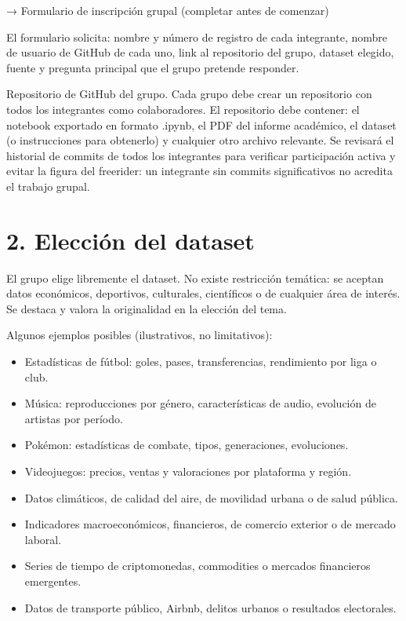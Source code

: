 \documentclass[10pt]{article}
\begin{document}
→ Formulario de inscripción grupal (completar antes de comenzar)

El formulario solicita: nombre y número de registro de cada integrante, nombre de usuario de GitHub de cada uno, link al repositorio del grupo, dataset elegido, fuente y pregunta principal que el grupo pretende responder.

Repositorio de GitHub del grupo. Cada grupo debe crear un repositorio con todos los integrantes como colaboradores. El repositorio debe contener: el notebook exportado en formato .ipynb, el PDF del informe académico, el dataset (o instrucciones para obtenerlo) y cualquier otro archivo relevante. Se revisará el historial de commits de todos los integrantes para verificar participación activa y evitar la figura del freerider: un integrante sin commits significativos no acredita el trabajo grupal.

\section*{2. Elección del dataset}
El grupo elige libremente el dataset. No existe restricción temática: se aceptan datos económicos, deportivos, culturales, científicos o de cualquier área de interés. Se destaca y valora la originalidad en la elección del tema.

Algunos ejemplos posibles (ilustrativos, no limitativos):

\begin{itemize}
  \item Estadísticas de fútbol: goles, pases, transferencias, rendimiento por liga o club.
  \item Música: reproducciones por género, características de audio, evolución de artistas por período.
  \item Pokémon: estadísticas de combate, tipos, generaciones, evoluciones.
  \item Videojuegos: precios, ventas y valoraciones por plataforma y región.
  \item Datos climáticos, de calidad del aire, de movilidad urbana o de salud pública.
  \item Indicadores macroeconómicos, financieros, de comercio exterior o de mercado laboral.
  \item Series de tiempo de criptomonedas, commodities o mercados financieros emergentes.
  \item Datos de transporte público, Airbnb, delitos urbanos o resultados electorales.
\end{itemize}
\end{document}
